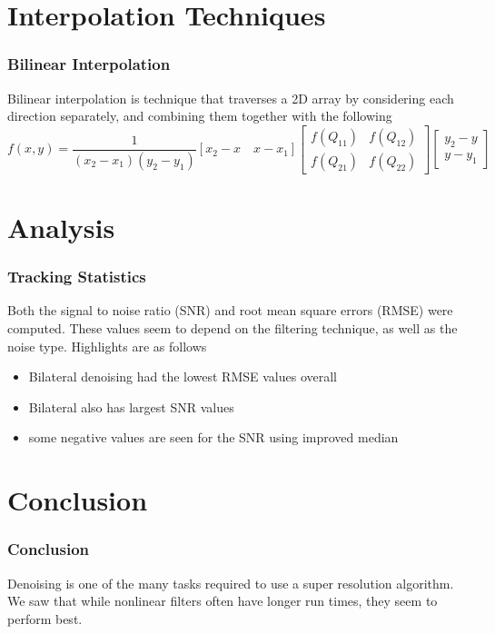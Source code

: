 \documentclass{beamer}
\begin{document}
\section{Interpolation Techniques}
%
\begin{frame}
  \frametitle{Bilinear Interpolation}
  Bilinear interpolation is technique that traverses a 2D array by considering
  each direction separately, and combining them together with the following
  \[f(x, y) = \frac{1}{(x_2 - x_1)(y_2-y_1)} [x_2-x \quad x - x_1]
\begin{bmatrix} f(Q_{11}) & f(Q_{12}) \\ f(Q_{21}) & f(Q_{22}) \end{bmatrix} \begin{bmatrix} y_2 - y \\ y-y_1 \end{bmatrix}\]
\end{frame}

\section{Analysis}
%
\begin{frame}
  \frametitle{Tracking Statistics}
  Both the signal to noise ratio (SNR) and root mean square errors
  (RMSE) were computed. These values seem to depend on the filtering
  technique, as well as the noise type. Highlights are as follows
  \begin{itemize}
  \item Bilateral denoising had the lowest RMSE values overall
    \item Bilateral also has largest SNR values
    \item some negative values are seen for the SNR using improved
      median
    \end{itemize}
\end{frame}
%
\section{Conclusion}
%
\begin{frame}
  \frametitle{Conclusion}
Denoising is one of the many tasks required to use a super resolution
algorithm. We saw that while nonlinear filters often have longer
run times, they seem to perform best. 
\end{frame}

  
\end{document}
